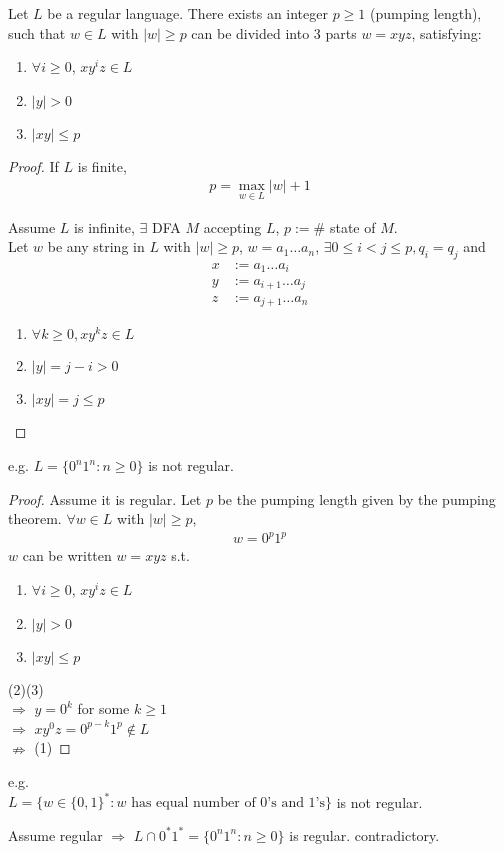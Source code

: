 \begin{theorem}
    Let $L$ be a regular language. There exists an integer $p\ge 1$ (pumping length), such that $w\in L$ with $|w|\ge p$ can be  divided into 3 parts $w=xyz$, satisfying:
    \begin{enumerate}
        \item $\forall i\ge 0$, $xy^iz \in L$
        \item $|y|>0$
        \item $|xy|\le p$
    \end{enumerate}
\end{theorem}
\begin{proof}
    If $L$ is finite,
    \begin{align*}
        p=\max_{w\in L}|w|+1
    \end{align*} 

    Assume $L$ is infinite, $\exists$ DFA $M$ accepting $L$, $p:=\#$ state of $M$. \\
    Let $w$ be any string in $L$ with $|w|\ge p$, $w=a_1\dots a_n$, $\exists 0\le i<j\le p, q_i=q_j$ and 
    \begin{align*}
        x&:=a_1\dots a_i\\
        y&:=a_{i+1}\dots a_j\\
        z&:=a_{j+1}\dots a_n
    \end{align*}
    \begin{enumerate}
        \item $\forall k\ge 0, xy^kz\in L$
        \item $|y|=j-i>0$
        \item $|xy|=j\le p$
    \end{enumerate}
\end{proof}

e.g. $L=\{ 0^n1^n: n\ge 0 \}$ is not regular. 
\begin{proof}
    Assume it is regular. Let $p$ be the pumping length given by the pumping theorem. $\forall w\in L$ with $|w|\ge p$,
    \begin{align*}
        w=0^p1^p
    \end{align*}
    $w$ can be written $w=xyz$ s.t. 
    \begin{enumerate}
        \item $\forall i\ge 0$, $xy^iz \in L$
        \item $|y|>0$
        \item $|xy|\le p$
    \end{enumerate}

    (2)(3) \\ 
    \indent $\Rightarrow$ $y=0^k$ for some $k\ge 1$\\
    \indent $\Rightarrow$ $xy^0z=0^{p-k}1^p \notin L$\\
    \indent $\nRightarrow$ (1) 
\end{proof}

e.g. \\
$L=\{ w\in \{ 0,1 \}^*: \text{$w$ has equal number of 0's and 1's} \}$ is not regular. 

Assume regular $\Rightarrow$ $L\cap 0^*1^*=\{ 0^n1^n:n\ge 0 \}$ is regular. contradictory. 